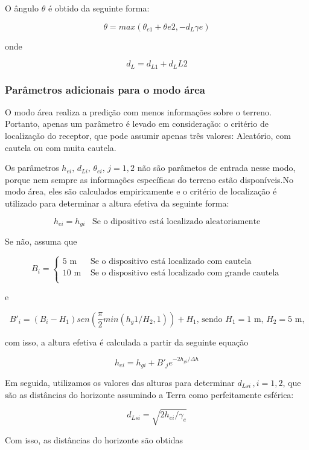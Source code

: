 O ângulo $\theta$ é obtido da seguinte forma:

\[
\theta = max(\theta_{e1} + \theta{e2}, -d_{L} \gamma e)
\]

onde

\[
d_L = d_{L1} + d_L{L2}
\]

\subsubsection{Parâmetros adicionais para o modo área}

O modo área realiza a predição com menos informações sobre o terreno. Portanto, apenas um parâmetro é levado em consideração: o critério de localização do receptor, que pode assumir apenas três valores: Aleatório, com cautela ou com muita cautela.

Os parâmetros \begin{math}h_{ei}, \, d_{Li}, \, \theta_{ei}, \, j=1,2\end{math} não são parâmetos de entrada nesse modo, porque nem sempre as informações específicas do terreno estão disponíveis.No modo área, eles são calculados empiricamente e o critério de localização é utilizado para determinar a altura efetiva da seguinte forma:

\[
h_{ei} = h_{gi} \,\,\,\,\, \text{Se o dipositivo está localizado aleatoriamente}
\]

Se não, assuma que

\[ B_i = \begin{cases} 
      5 \text{ m} & \textrm{ Se o dispositivo está localizado com cautela} \\
      10 \text{ m} & \textrm{ Se o dispositivo está localizado com grande cautela} \\
   \end{cases} \]  
   
e

\[ B'_i = (B_i - H_1)sen(\frac{\pi}{2} min(h_g1/H_2,1)) + H_1 \textrm{, sendo $H_1 = 1$ m, $H_2 = 5$ m,} \]

com isso, a altura efetiva é calculada a partir da seguinte equação

\[ h_{ei} = h_{gi} + B'_je^{-2h_{gi}/\Delta h} \]

Em seguida, utilizamos os valores das alturas para determinar $d_{Lsi}\, , i=1,2$, que são as distâncias do horizonte assumindo a Terra como perfeitamente esférica:

\[
d_{Lsi} = \sqrt{2h_{ei}/\gamma_e}
\]

Com isso, as distâncias do horizonte são obtidas


